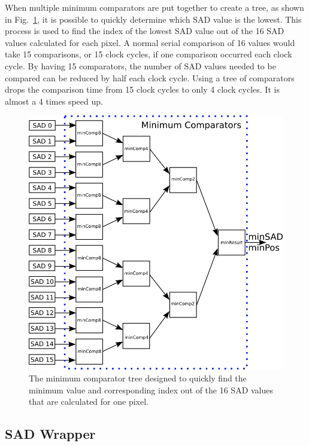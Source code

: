 When multiple minimum comparators are put together to create a tree, as shown in Fig.~\ref{fig:minComp}, it is possible to quickly determine which SAD value is the lowest. This process is used to find the index of the lowest SAD value out of the 16 SAD values calculated for each pixel. A normal serial comparison of 16 values would take 15 comparisons, or 15 clock cycles, if one comparison occurred each clock cycle. By having 15 comparators, the number of SAD values needed to be compared can be reduced by half each clock cycle. Using a tree of comparators drops the comparison time from 15 clock cycles to only 4 clock cycles. It is almost a 4 times speed up.

\begin{figure}[h]
	\begin{center}
		\includegraphics[width=150mm]{figures/minComparator.png}
		\captionfonts
		\caption{The minimum comparator tree designed to quickly find the minimum value and corresponding index out of the 16 SAD values that are calculated for one pixel.}
		\label{fig:minComp}
	\end{center}
\end{figure}

\subsection{SAD Wrapper}

